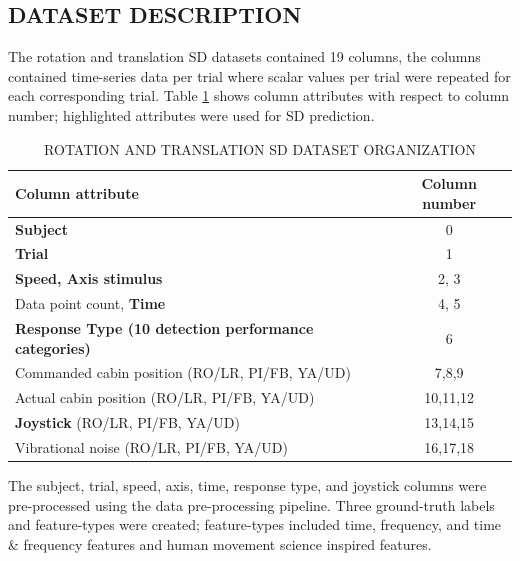 \documentclass{ieeeaccess}
\begin{document}
\subsection{DATASET DESCRIPTION}
The rotation and translation SD datasets contained 19 columns, the columns contained time-series data per trial where scalar values per trial were repeated for each corresponding trial. Table \ref{table4} shows column attributes with respect to column number; highlighted attributes were used for SD prediction.
\begin{table}[h!]
\caption{ROTATION AND TRANSLATION SD DATASET ORGANIZATION}
\label{table4}
\centering
\begin{tabular}{l|c}
\hline
Column attribute & Column number\\
\hline
\textbf{Subject} & 0\\
\textbf{Trial} & 1\\
\textbf{Speed, Axis stimulus} & 2, 3\\
Data point count, \textbf{Time} & 4, 5\\
\textbf{Response Type (10 detection performance categories)} & 6\\
Commanded cabin position (RO/LR, PI/FB, YA/UD) & 7,8,9\\
Actual cabin position (RO/LR, PI/FB, YA/UD) & 10,11,12\\
\textbf{Joystick} (RO/LR, PI/FB, YA/UD) & 13,14,15\\
Vibrational noise (RO/LR, PI/FB, YA/UD) & 16,17,18\\
\hline
\end{tabular}
\end{table}
The subject, trial, speed, axis, time, response type, and joystick columns were pre-processed using the data pre-processing pipeline. Three ground-truth labels and feature-types were created; feature-types included time, frequency, and time \& frequency features and human movement science inspired features.
\end{document}
